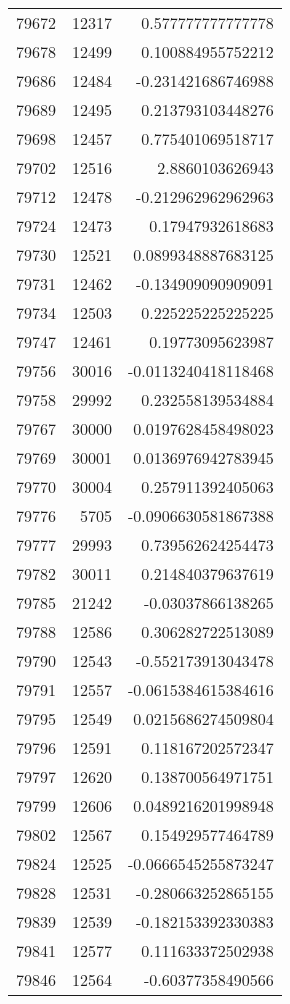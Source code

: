 \begin{tabular}{r | r | r}
79672 & 12317 & 0.577777777777778 \\
79678 & 12499 & 0.100884955752212 \\
79686 & 12484 & -0.231421686746988 \\
79689 & 12495 & 0.213793103448276 \\
79698 & 12457 & 0.775401069518717 \\
79702 & 12516 & 2.8860103626943 \\
79712 & 12478 & -0.212962962962963 \\
79724 & 12473 & 0.17947932618683 \\
79730 & 12521 & 0.0899348887683125 \\
79731 & 12462 & -0.134909090909091 \\
79734 & 12503 & 0.225225225225225 \\
79747 & 12461 & 0.19773095623987 \\
79756 & 30016 & -0.0113240418118468 \\
79758 & 29992 & 0.232558139534884 \\
79767 & 30000 & 0.0197628458498023 \\
79769 & 30001 & 0.0136976942783945 \\
79770 & 30004 & 0.257911392405063 \\
79776 & 5705 & -0.0906630581867388 \\
79777 & 29993 & 0.739562624254473 \\
79782 & 30011 & 0.214840379637619 \\
79785 & 21242 & -0.03037866138265 \\
79788 & 12586 & 0.306282722513089 \\
79790 & 12543 & -0.552173913043478 \\
79791 & 12557 & -0.0615384615384616 \\
79795 & 12549 & 0.0215686274509804 \\
79796 & 12591 & 0.118167202572347 \\
79797 & 12620 & 0.138700564971751 \\
79799 & 12606 & 0.0489216201998948 \\
79802 & 12567 & 0.154929577464789 \\
79824 & 12525 & -0.0666545255873247 \\
79828 & 12531 & -0.280663252865155 \\
79839 & 12539 & -0.182153392330383 \\
79841 & 12577 & 0.111633372502938 \\
79846 & 12564 & -0.60377358490566 \\

\end{tabular}
